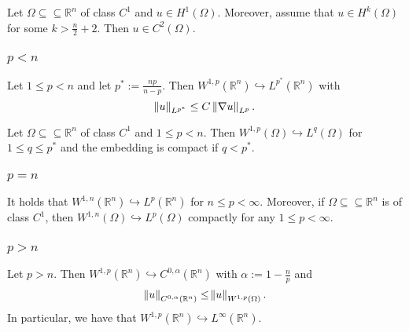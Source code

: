 \begin{corollary}
	Let $\Omega \subseteq \subseteq \mathbb{R}^n$ of class $C^1$ and $u \in H^1(\Omega)$. Moreover, assume that $u \in H^k(\Omega)$ for some $k > \frac{n}{2} + 2$. Then $u \in C^2(\Omega)$.
\end{corollary}

\subsubsection*{$p < n$}

\begin{theorem}
	Let $1 \leq p < n$ and let $p^* := \frac{np}{n - p}$. Then $W^{1,p}(\mathbb{R}^n) \hookrightarrow L^{p^*}(\mathbb{R}^n)$ with
	\begin{equation*}
		\norm{u}_{L^{p^*}} \leq C \norm[0]{\nabla u}_{L^p}.
	\end{equation*}
\end{theorem}

\begin{theorem}
	Let $\Omega \subseteq \subseteq \mathbb{R}^n$ of class $C^1$ and $1 \leq p < n$. Then $W^{1,p}(\Omega) \hookrightarrow L^q(\Omega)$ for $1 \leq q \leq p^*$ and the embedding is compact if $q < p^*$.
\end{theorem}

\subsubsection*{$p = n$}

\begin{theorem}
	It holds that $W^{1,n}(\mathbb{R}^n) \hookrightarrow L^p(\mathbb{R}^n)$ for $n \leq p < \infty$. Moreover, if $\Omega \subseteq \subseteq \mathbb{R}^n$ is of class $C^1$, then $W^{1,n}(\Omega) \hookrightarrow L^p(\Omega)$ compactly for any $1 \leq p < \infty$.
\end{theorem}

\subsubsection*{$p > n$}

\begin{theorem}
	Let $p > n$. Then $W^{1,p}(\mathbb{R}^n) \hookrightarrow C^{0,\alpha}(\mathbb{R}^n)$ with $\alpha := 1 - \frac{n}{p}$ and
	\begin{equation*}
		\norm[0]{u}_{C^{0,\alpha}(\mathbb{R}^n)} \leq \norm{u}_{W^{1,p}(\Omega)}.
	\end{equation*}
	In particular, we have that $W^{1,p}(\mathbb{R}^n) \hookrightarrow L^\infty(\mathbb{R}^n)$.
\end{theorem}

